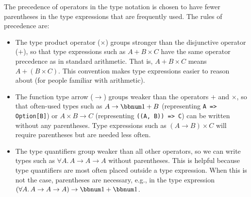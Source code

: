 The precedence of operators
in the type notation is chosen to have fewer parentheses in the type
expressions that are frequently used. The rules of precedence are:
\begin{itemize}
\item The type product operator ($\times$) groups stronger than the disjunctive
operator ($+$), so that type expressions such as $A+B\times C$ have
the same operator precedence as in standard arithmetic. That is, $A+B\times C$
means $A+\left(B\times C\right)$. This convention makes type expressions
easier to reason about (for people familiar with arithmetic).
\item The function type arrow ($\rightarrow$) groups weaker than the operators
$+$ and $\times$, so that often-used types such as $A\rightarrow\bbnum 1+B$
(representing \lstinline!A => Option[B]!) or $A\times B\rightarrow C$
(representing \lstinline!((A, B)) => C!) can be written without any
parentheses. Type expressions such as $\left(A\rightarrow B\right)\times C$
will require parentheses but are needed less often.
\item The type quantifiers group weaker than all other operators, so we
can write types such as $\forall A.\,A\rightarrow A\rightarrow A$
without parentheses. This is helpful because type quantifiers are
most often placed outside a type expression. When this is not the
case, parentheses are necessary, e.g., in the type expression $\left(\forall A.\,A\rightarrow A\rightarrow A\right)\rightarrow\bbnum 1+\bbnum 1$.
\end{itemize}
